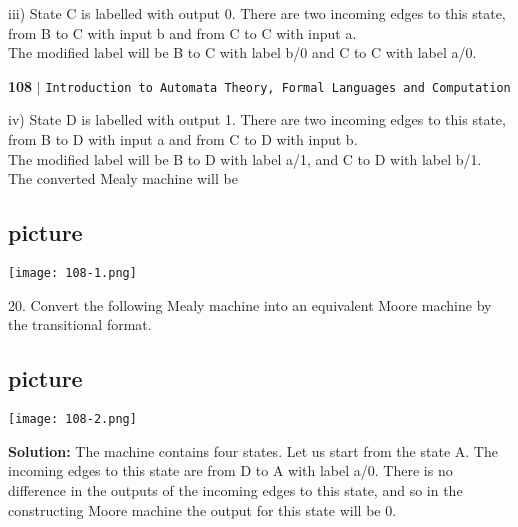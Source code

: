 \documentclass{article}
\begin{document}
\vspace*{0.2cm}
iii) State C is labelled with output 0. There are two incoming edges to this state, from B to C with
input b and from C to C with input a.\\
\hspace*{0.5cm} The modified label will be B to C with label b/0 and C to C with label a/0.\\


\newpage

\begin{flushleft}
    \textbf{108}\hspace*{0.1cm} \textbf{$|$} \hspace*{0.1cm} \texttt{Introduction to Automata Theory, Formal Languages and Computation}
  \end{flushleft}
  \vspace*{0.5cm}

iv) State D is labelled with output 1. There are two incoming edges to this state, from B to D with
input a and from C to D with input b.\\
\hspace*{0.5cm} The modified label will be B to D with label a/1, and C to D with label b/1.\\
\hspace*{0.5cm} The converted Mealy machine will be\\

\vspace*{0.3cm}
\begin{center}
\section{picture}
\texttt{[image: 108-1.png]}
\end{center}

20. Convert the following Mealy machine into an equivalent Moore machine by the transitional
format.\\

\vspace*{0.3cm}
\begin{center}
\section{picture}
\texttt{[image: 108-2.png]}
\end{center}

\textbf{Solution:} The machine contains four states. Let us start from the state A. The incoming
edges to this state are from D to A with label a/0. There is no difference in the outputs of the
incoming edges to this state, and so in the constructing Moore machine the output for this
state will be 0.\\
\end{document}
